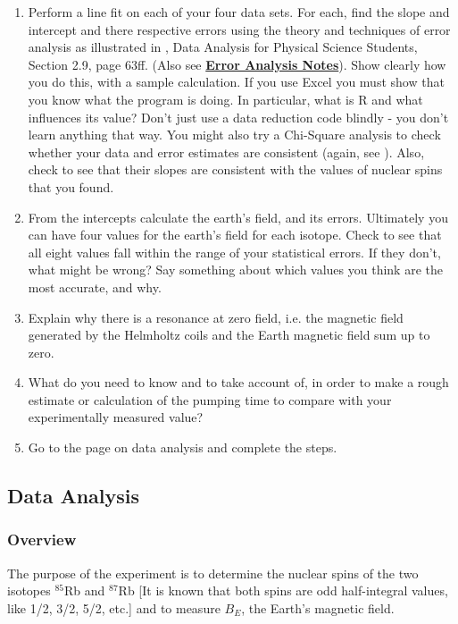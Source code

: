 \documentclass{../lab}
\begin{document}
\begin{enumerate}
    \item Perform a line fit on each of your four data sets. For each, find the slope and intercept and there respective errors using the theory and techniques of error analysis as illustrated in \citeauthor{lyons}, Data Analysis for Physical Science Students, Section 2.9, page 63ff. (Also see \href{\ErrorAnalysisNotes}{\textbf{Error Analysis Notes}}). Show clearly how you do this, with a sample calculation. If you use Excel you must show that you know what the program is doing. In particular, what is R and what influences its value? Don't just use a data reduction code blindly - you don't learn anything that way. You might also try a Chi-Square analysis to check whether your data and error estimates are consistent (again, see \citeauthor{lyons}). Also, check to see that their slopes are consistent with the values of nuclear spins that you found.

    \item From the intercepts calculate the earth's field, and its errors. Ultimately you can have four values for the earth's field for each isotope. Check to see that all eight values fall within the range of your statistical errors. If they don't, what might be wrong? Say something about which values you think are the most accurate, and why.

    \item Explain why there is a resonance at zero field, i.e. the magnetic field generated by the Helmholtz coils and the Earth magnetic field sum up to zero.

    \item What do you need to know and to take account of, in order to make a rough estimate or calculation of the pumping time to compare with your experimentally measured value?

    \item Go to the page on data analysis and complete the steps.
\end{enumerate}

\subsection{Data Analysis}

\subsubsection{Overview}

The purpose of the experiment is to determine the nuclear spins of the two isotopes $^{85}$Rb and $^{87}$Rb [It is known that both spins are odd half-integral values, like 1/2, 3/2, 5/2, etc.] and to measure $B_E$, the Earth's magnetic field. \\
\end{document}
